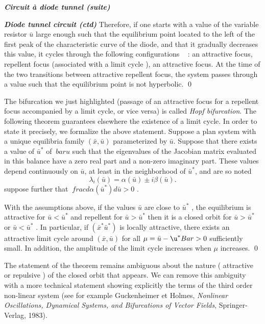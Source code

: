 {\begin{exemple}{\bf \em Circuit {à} diode tunnel (suite)}
\begin{exemple} {\em\bf Diode tunnel circuit (ctd)}
Therefore, if one starts with a value of the variable resistor $\bar u$ large enough such that the equilibrium point
located to the left of the first peak of the characteristic curve of the diode, and that
it gradually decreases this value, it cycles through the following configurations ~ : 
an attractive focus, repellent focus (associated with a limit cycle ), an
attractive focus. At the time of the two transitions between attractive
repellent focus, the system passes through a value such that the equilibrium point is not
hyperbolic.
\qed
\end{exemple}

The bifurcation we just highlighted (passage of an attractive focus for a repellent focus accompanied by a limit cycle, or vice versa) is
called {\em Hopf bifurcation}. The following theorem guarantees elsewhere
the existence of a limit cycle. In order to state it precisely, we formalize the above statement. 
Suppose a plan system with a unique equilibria family $(\bar x , \bar u)$ parameterized by $\bar u$. 
Suppose that there exists a value of $\bar u^*$ of $ \ bar u $ such that the eigenvalues
of the Jacobian matrix evaluated in this balance have a zero real part and a non-zero imaginary part. 
These values depend continuously on $\bar u$, at least in the neighborhood of $\bar u ^*$, 
and are so noted $$ \lambda_i ( \bar u) = \alpha ( \bar u) \pm i \beta ( \bar u).$$ 
suppose further that $\ frac{ d \alpha ( \bar u ^*) {d} \bar u} > 0$ .

\begin{theoreme}
  With the assumptions above, if the values
 $ \bar u $ are close to $ \bar u^* $ , the equilibrium is attractive
 for $ \bar u < \bar u^* $ and repellent for $ \bar u > \bar u^* $ then
 it is a closed orbit for $ \bar u > \bar u^* $ or $ \bar u < \bar u^* $ .
 In particular, if $ ( \bar x^* \bar u^*)$ is locally attractive, there exists an attractive limit cycle around
 $ (\bar x , \bar u) $ for all $ \mu = \bar u- \u^* Bar > 0$ sufficiently small.
In addition, the amplitude of the limit cycle increases when $ \mu $ increases.
\qed
\end{theoreme}
   
\begin{remarque}
The statement of the theorem remains
ambiguous about the nature ( attractive or repulsive ) of the closed orbit
that appears. We can remove this ambiguity with
a more technical statement showing explicitly
the terms of the third order non-linear system
(see for example Guckenheimer et Holmes, 
{\em Nonlinear Oscillations, Dynamical Systems, and Bifurcations of Vector 
Fields}, Springer-Verlag, 1983). 
\end{remarque}


\end{exemple}}
